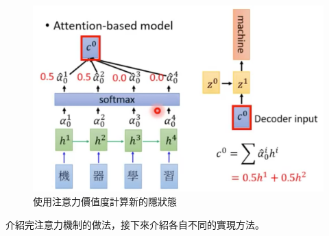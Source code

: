 \begin{figure}[htbp]
    \hfil
    \begin{minipage}[t]{0.45\textwidth}
        \includegraphics[width=\textwidth]{./figures/chapter02_method/attention-based_model2.png}
        \caption {使用注意力價值度計算新的隱狀態}
        \label{attention-based_model2}
    \end{minipage}
    \hfil
\end{figure}

介紹完注意力機制的做法，接下來介紹各自不同的實現方法。

